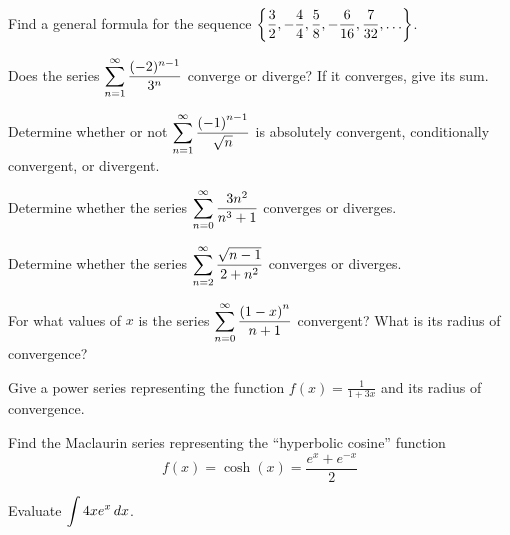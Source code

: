 \documentclass[12pt]{exam}
\newcommand{\ds}{\ensuremath{\displaystyle}}
\begin{document}
\begin{questions}

\setcounter{question}{0}

\question[10]
Find a general formula for the sequence
$
\ds \left\{
\frac{3}{2},
-\frac{4}{4},
\frac{5}{8},
-\frac{6}{16},
\frac{7}{32},
\ldots \right\}
$.

\vfill

\newpage

\question[10]
Does the series $\ds \sum_{n=1}^\infty \frac{(-2)^{n-1}}{3^n}$ converge or
diverge? If it converges, give its sum.

\vfill

\newpage

\question[10]
Determine whether or not
$\ds \sum_{n=1}^{\infty} \frac{\left(-1\right)^{n-1}}{\sqrt{n}}$
is absolutely convergent, conditionally convergent, or divergent.

\vfill

\newpage

\question[10]
Determine whether the series
$\ds \sum_{n = 0}^{\infty} \frac{3n^2}{n^3+1}$
converges or diverges.

\vfill

\newpage

\question[10]
Determine whether the series
$\ds \sum_{n = 2}^{\infty} \frac{\sqrt{n-1}}{2+n^2}$
converges or diverges.

\vfill

\newpage

\question[10]
For what values of $x$ is the series
$\ds \sum_{n=0}^{\infty} \frac{\left(1-x\right)^n}{n+1}$ convergent?
What is its radius of convergence?

\vfill

\newpage

\question[10]
Give a power series representing the function $f(x)=\frac{1}{1+3x}$ and
its radius of convergence.

\vfill

\newpage

\question[10]
Find the Maclaurin series representing the ``hyperbolic cosine'' function
\[f(x)=\cosh(x)=\frac{e^x+e^{-x}}{2}\]

\vfill

\newpage

\question[10]
Evaluate $\ds\int 4xe^x\,dx$.

\vfill





\end{questions}
\end{document}
